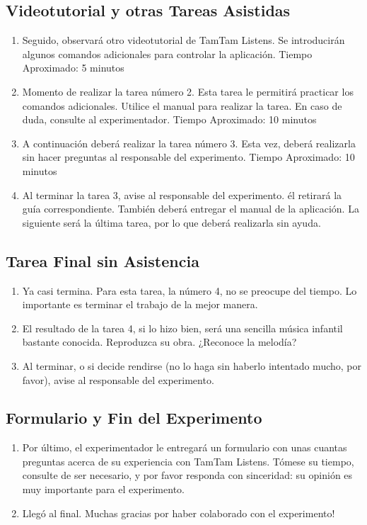 \subsection{Videotutorial y otras Tareas Asistidas}

\begin{enumerate}
    \setcounter{enumi}{\theenumTemp}
    \item Seguido, observar\'a otro videotutorial de TamTam Listens. Se introducir\'an algunos comandos adicionales para controlar la aplicaci\'on. Tiempo Aproximado: 5 minutos
    \item Momento de realizar la tarea n\'umero 2. Esta tarea le permitir\'a practicar los comandos adicionales. Utilice el manual para realizar la tarea. En caso de duda, consulte al experimentador.
    Tiempo Aproximado: 10 minutos
    \item A continuaci\'on deber\'a realizar la tarea n\'umero 3. Esta vez, deber\'a realizarla sin hacer preguntas al responsable del experimento.
    Tiempo Aproximado: 10 minutos
    \item Al terminar la tarea 3, avise al responsable del experimento. \'el retirar\'a la gu\'ia correspondiente. Tambi\'en deber\'a entregar el manual de la aplicaci\'on. La siguiente ser\'a la \'ultima tarea, por lo que deber\'a realizarla sin ayuda.
    \setcounter{enumTemp}{\theenumi}
\end{enumerate}

\subsection{Tarea Final sin Asistencia}

\begin{enumerate}
    \setcounter{enumi}{\theenumTemp}
    \item Ya casi termina. Para esta tarea, la n\'umero 4, no se preocupe del tiempo. Lo importante es terminar el trabajo de la mejor manera. 
    \item El resultado de la tarea 4, si lo hizo bien, ser\'a una sencilla m\'usica infantil bastante conocida. Reproduzca su obra. ¿Reconoce la melod\'ia?
    \item Al terminar, o si decide rendirse (no lo haga sin haberlo intentado mucho, por favor), avise al responsable del experimento.
    \setcounter{enumTemp}{\theenumi}
\end{enumerate}

\subsection{Formulario y Fin del Experimento}

\begin{enumerate}
    \setcounter{enumi}{\theenumTemp}
    \item Por \'ultimo, el experimentador le entregar\'a un formulario con unas cuantas preguntas acerca de su experiencia con TamTam Listens. T\'omese su tiempo, consulte de ser necesario, y por favor responda con sinceridad: su opini\'on es muy importante para el experimento.
    \item Lleg\'o al final. Muchas gracias por haber colaborado con el experimento! 
\end{enumerate}
